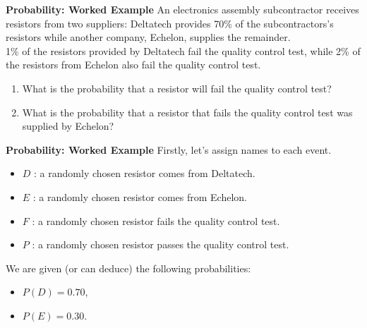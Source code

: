 
\noindent \textbf{Probability: Worked Example }
An electronics assembly subcontractor receives resistors from two suppliers: Deltatech provides
70\% of the subcontractors's resistors while another company, Echelon, supplies the remainder.
\\
1\% of the resistors provided by Deltatech fail the quality control test, while 2\% of the
resistors from Echelon also fail the quality control test.

\begin{enumerate}
	\item What is the probability that a resistor will fail the quality control test?
	\item What is the probability that a resistor that fails the quality control test was supplied by Echelon?
\end{enumerate}


\noindent \textbf{Probability: Worked Example}
Firstly, let's assign names to each event.
\begin{itemize}
	\item $D$ : a randomly chosen resistor comes from Deltatech.
	\item $E$ : a randomly chosen resistor comes from Echelon.
	\item $F$ : a randomly chosen resistor fails the quality control test.
	\item $P$ : a randomly chosen resistor passes the quality control test.
\end{itemize}
\bigskip
We are given (or can deduce) the following probabilities:
\begin{itemize}
	\item $P(D) = 0.70$,
	\item $P(E) = 0.30$.
\end{itemize}




